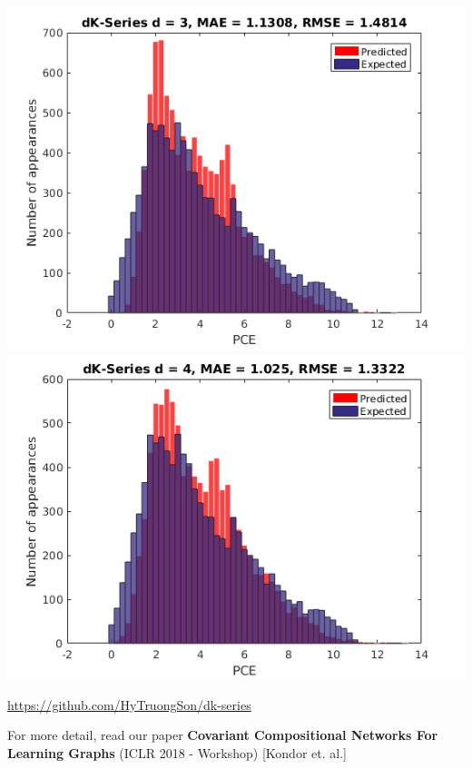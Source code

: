 \documentclass{beamer}
\begin{document}
\begin{frame}
\begin{justify}
\includegraphics[scale=0.2]{d3}
\includegraphics[scale=0.22]{d4}
\end{justify}
\begin{center}
\url{https://github.com/HyTruongSon/dk-series}
\end{center}
For more detail, read our paper \textbf{Covariant Compositional Networks For Learning Graphs} (ICLR 2018 - Workshop) [Kondor et. al.]
\end{frame}
\end{document}
